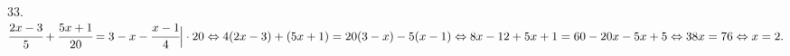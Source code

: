 33. $\cfrac{2x-3}{5}+\cfrac{5x+1}{20}=3-x-\cfrac{x-1}{4}\Big|\cdot20\Leftrightarrow
4(2x-3)+(5x+1)=20(3-x)-5(x-1)\Leftrightarrow8x-12+5x+1=60-20x-5x+5\Leftrightarrow
38x=76\Leftrightarrow x=2.$\\
